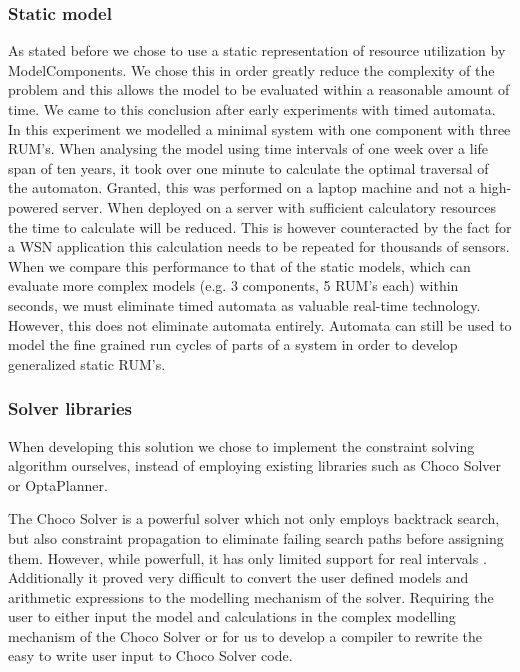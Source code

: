 \subsubsection{Static model}
As stated before we chose to use a static representation of resource utilization by ModelComponents. We chose this in order greatly reduce the complexity of the problem and this allows the model to be evaluated within a reasonable amount of time. We came to this conclusion after early experiments with timed automata. In this experiment we modelled a minimal system with one component with three RUM's. When analysing the model using time intervals of one week over a life span of ten years, it took over one minute to calculate the optimal traversal of the automaton. Granted, this was performed on a laptop machine and not a high-powered server. When deployed on a server with sufficient calculatory resources the time to calculate will be reduced. This is however counteracted by the fact for a WSN application this calculation needs to be repeated for thousands of sensors. When we compare this performance to that of the static models, which can evaluate more complex models (e.g. 3 components, 5 RUM's each) within seconds, we must eliminate timed automata as valuable real-time technology. However, this does not eliminate automata entirely. Automata can still be used to model the fine grained run cycles of parts of a system in order to develop generalized static RUM's.


\subsubsection{Solver libraries}
When developing this solution we chose to implement the constraint solving algorithm ourselves, instead of employing existing libraries such as Choco Solver\cite{web:choco} or OptaPlanner\cite{web:opta}. 

The Choco Solver is a powerful solver which not only employs backtrack search, but also constraint propagation to eliminate failing search paths before assigning them. However, while powerfull, it has only limited support for real intervals \cite{ibex-choco}. Additionally it proved very difficult to convert the user defined models and arithmetic expressions to the modelling mechanism of the solver. Requiring the user to either input the model and calculations in the complex modelling mechanism of the Choco Solver or for us to develop a compiler to rewrite the easy to write user input to Choco Solver code.


